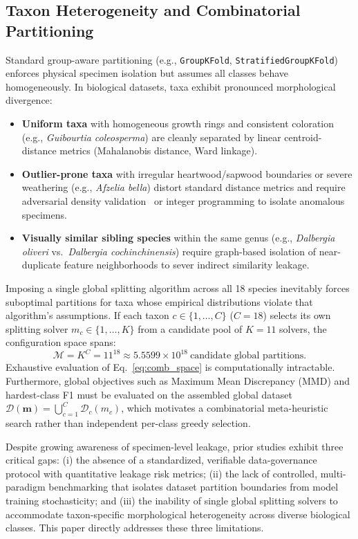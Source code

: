 \documentclass[a4paper,fleqn]{cas-sc}
\begin{document}
\subsection{Taxon Heterogeneity and Combinatorial Partitioning}
Standard group-aware partitioning (e.g., \texttt{GroupKFold}, \texttt{StratifiedGroupKFold}) enforces physical specimen isolation but assumes all classes behave homogeneously. In biological datasets, taxa exhibit pronounced morphological divergence:
\begin{itemize}
\item \textbf{Uniform taxa} with homogeneous growth rings and consistent coloration (e.g., \textit{Guibourtia coleosperma}) are cleanly separated by linear centroid-distance metrics (Mahalanobis distance, Ward linkage).
\item \textbf{Outlier-prone taxa} with irregular heartwood/sapwood boundaries or severe weathering (e.g., \textit{Afzelia bella}) distort standard distance metrics and require adversarial density validation~\cite{adversarialvalidation} or integer programming to isolate anomalous specimens.
\item \textbf{Visually similar sibling species} within the same genus (e.g., \textit{Dalbergia oliveri} vs.\ \textit{Dalbergia cochinchinensis}) require graph-based isolation of near-duplicate feature neighborhoods to sever indirect similarity leakage.
\end{itemize}

Imposing a single global splitting algorithm across all 18 species inevitably forces suboptimal partitions for taxa whose empirical distributions violate that algorithm's assumptions. If each taxon $c \in \{1,\dots,C\}$ ($C=18$) selects its own splitting solver $m_c \in \{1,\dots,K\}$ from a candidate pool of $K=11$ solvers, the configuration space spans:
\begin{equation}
\mathcal{M} = K^{C} = 11^{18} \approx 5.5599 \times 10^{18}\ \text{candidate global partitions.}
\label{eq:comb_space}
\end{equation}
Exhaustive evaluation of Eq.~\eqref{eq:comb_space} is computationally intractable. Furthermore, global objectives such as Maximum Mean Discrepancy ($\mathrm{MMD}$) and hardest-class F1 must be evaluated on the assembled global dataset $\mathcal{D}(\boldsymbol{m}) = \bigcup_{c=1}^{C} \mathcal{D}_c(m_c)$, which motivates a combinatorial meta-heuristic search rather than independent per-class greedy selection.

Despite growing awareness of specimen-level leakage, prior studies exhibit three critical gaps: (i) the absence of a standardized, verifiable data-governance protocol with quantitative leakage risk metrics; (ii) the lack of controlled, multi-paradigm benchmarking that isolates dataset partition boundaries from model training stochasticity; and (iii) the inability of single global splitting solvers to accommodate taxon-specific morphological heterogeneity across diverse biological classes. This paper directly addresses these three limitations.
\end{document}
